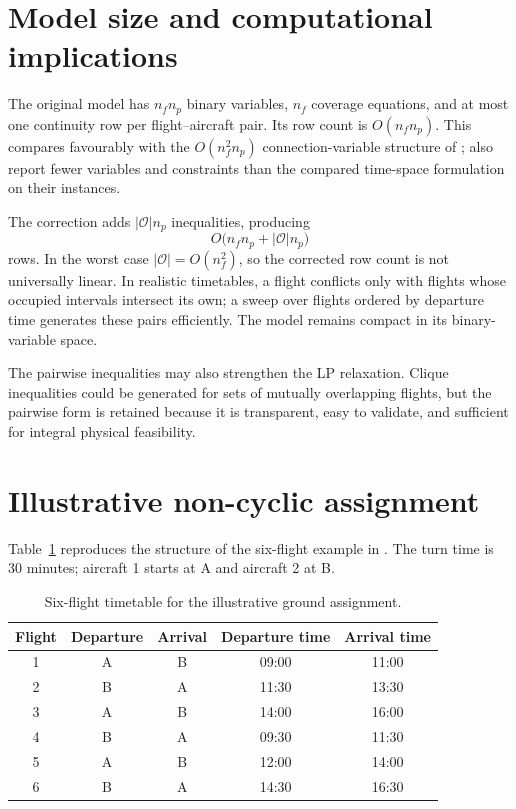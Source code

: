 \section{Model size and computational implications}

The original model has $n_fn_p$ binary variables, $n_f$ coverage equations,
and at most one continuity row per flight--aircraft pair. Its row count is
$O(n_fn_p)$. This compares favourably with the $O(n_f^2n_p)$
connection-variable structure of \citet{levin1971scheduling};
\citet{khaled2018compact} also report fewer variables and constraints than the
compared time-space formulation on their instances.

The correction adds $|\mathcal O|n_p$ inequalities, producing
\begin{equation}
    O\bigl(n_fn_p+|\mathcal O|n_p\bigr)
    \label{eq:ground_model_size}
\end{equation}
rows. In the worst case $|\mathcal O|=O(n_f^2)$, so the corrected row count is
not universally linear. In realistic timetables, a flight conflicts only with
flights whose occupied intervals intersect its own; a sweep over flights ordered
by departure time generates these pairs efficiently. The model remains compact
in its binary-variable space.

The pairwise inequalities may also strengthen the LP relaxation. Clique
inequalities could be generated for sets of mutually overlapping flights, but
the pairwise form is retained because it is transparent, easy to validate, and
sufficient for integral physical feasibility.

\section{Illustrative non-cyclic assignment}

Table~\ref{tab:ground_example_timetable} reproduces the structure of the
six-flight example in \citet{khaled2018compact}. The turn time is 30 minutes;
aircraft 1 starts at A and aircraft 2 at B.

\begin{table}[t]
    \centering
    \small
    \caption{Six-flight timetable for the illustrative ground assignment.}
    \label{tab:ground_example_timetable}
    \begin{tabular}{ccccc}
        \toprule
        Flight & Departure & Arrival & Departure time & Arrival time \\
        \midrule
        1 & A & B & 09:00 & 11:00 \\
        2 & B & A & 11:30 & 13:30 \\
        3 & A & B & 14:00 & 16:00 \\
        4 & B & A & 09:30 & 11:30 \\
        5 & A & B & 12:00 & 14:00 \\
        6 & B & A & 14:30 & 16:30 \\
        \bottomrule
    \end{tabular}
\end{table}

